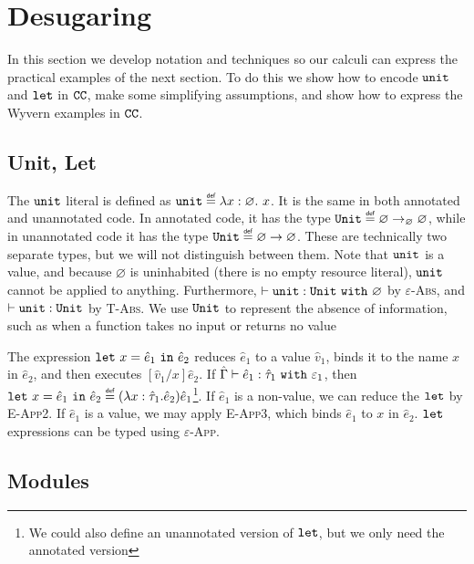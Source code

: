 \section{Desugaring}

In this section we develop notation and techniques so our calculi can express the practical examples of the next section. To do this we show how to encode $\mathtt{unit}$ and $\mathtt{let}$ in $\mathtt{CC}$, make some simplifying assumptions, and show how to express the Wyvern examples in $\mathtt{CC}$.

\subsection{Unit, Let}

The $\mathtt{unit}$ literal is defined as $\unit \defn \lambda x: \varnothing.~x$. It is the same in both annotated and unannotated code. In annotated code, it has the type $\Unit \defn \varnothing \rightarrow_{\varnothing} \varnothing$, while in unannotated code it has the type $\Unit \defn \varnothing \rightarrow \varnothing$. These are technically two separate types, but we will not distinguish between them. Note that $\mathtt{unit}$ is a value, and because $\varnothing$ is uninhabited (there is no empty resource literal), $\mathtt{unit}$ cannot be applied to anything. Furthermore, $\vdash \mathtt{unit}: \mathtt{Unit}~\mathtt{with}~ \varnothing$ by \textsc{$\varepsilon$-Abs}, and $\vdash \mathtt{unit}: \mathtt{Unit}$ by \textsc{T-Abs}. We use $\mathtt{Unit}$ to represent the absence of information, such as when a function takes no input or returns no value

The expression $\mathtt{let}~ x = \hat e_1~\mathtt{in}~ \hat e_2$ reduces $\hat e_1$ to a value $\hat v_1$, binds it to the name $x$ in $\hat e_2$, and then executes $[\hat v_1/x]\hat e_2$. If $\hat \Gamma \vdash \hat e_1: \hat \tau_1~\mathtt{with}~ \varepsilon_1$, then $\letxpr{x}{\hat e_1}{\hat e_2} \defn (\lambda x: \hat \tau_1 . \hat e_2) \hat e_1$\footnote{We could also define an unannotated version of $\mathtt{let}$, but we only need the annotated version}. If $\hat e_1$ is a non-value, we can reduce the $\mathtt{let}$ by \textsc{E-App2}. If $\hat e_1$ is a value, we may apply \textsc{E-App3}, which binds $\hat e_1$ to $x$ in $\hat e_2$. $\mathtt{let}$ expressions can be typed using \textsc{$\varepsilon$-App}.

\subsection{Modules}

